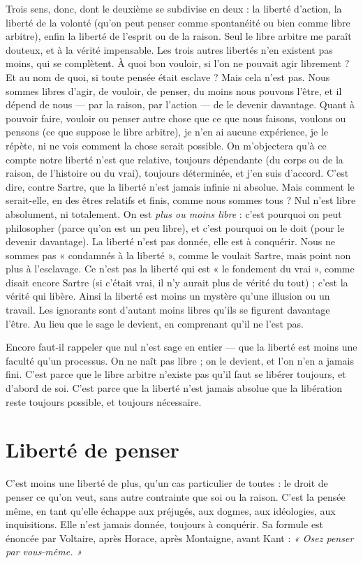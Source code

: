 {Trois sens, donc, dont le deuxième se subdivise en deux : la liberté d’action,
la liberté de la volonté (qu’on peut penser comme spontanéité ou bien comme
libre arbitre), enfin la liberté de l’esprit ou de la raison. Seul le libre arbitre me
paraît douteux, et à la vérité impensable. Les trois autres libertés n’en existent
pas moins, qui se complètent. À quoi bon vouloir, si l’on ne pouvait agir
librement ? Et au nom de quoi, si toute pensée était esclave ? Mais cela n’est
pas. Nous sommes libres d’agir, de vouloir, de penser, du moins nous pouvons
l'être, et il dépend de nous — par la raison, par l’action — de le devenir davantage.
Quant à pouvoir faire, vouloir ou penser autre chose que ce que nous faisons,
voulons ou pensons (ce que suppose le libre arbitre), je n’en ai aucune
expérience, je le répète, ni ne vois comment la chose serait possible. On
m'objectera qu’à ce compte notre liberté n’est que relative, toujours dépendante
(du corps ou de la raison, de l’histoire ou du vrai), toujours déterminée,
et j'en suis d’accord. C’est dire, contre Sartre, que la liberté n’est jamais infinie
ni absolue. Mais comment le serait-elle, en des êtres relatifs et finis, comme
nous sommes tous ? Nul n’est libre absolument, ni totalement. On est {\it plus ou
moins libre} : c’est pourquoi on peut philosopher (parce qu’on est un peu libre),
et c’est pourquoi on le doit (pour le devenir davantage). La liberté n’est pas
donnée, elle est à conquérir. Nous ne sommes pas « condamnés à la liberté »,
comme le voulait Sartre, mais point non plus à l'esclavage. Ce n’est pas la
liberté qui est « le fondement du vrai », comme disait encore Sartre (si c'était
vrai, il n’y aurait plus de vérité du tout) ; c’est la vérité qui libère. Ainsi la
liberté est moins un mystère qu’une illusion ou un travail. Les ignorants sont
d'autant moins libres qu'ils se figurent davantage l’être. Au lieu que le sage le
devient, en comprenant qu’il ne l’est pas.

Encore faut-il rappeler que nul n’est sage en entier — que la liberté est
moins une faculté qu’un processus. On ne naît pas libre ; on le devient, et l’on
n’en a jamais fini. C’est parce que le libre arbitre n’existe pas qu’il faut se libérer
toujours, et d’abord de soi. C’est parce que la liberté n’est jamais absolue que
la libération reste toujours possible, et toujours nécessaire.

\section{Liberté de penser}
C’est moins une liberté de plus, qu’un cas particulier
de toutes : le droit de penser ce qu’on veut,
sans autre contrainte que soi ou la raison. C’est la pensée même, en tant qu’elle
échappe aux préjugés, aux dogmes, aux idéologies, aux inquisitions. Elle n’est
jamais donnée, toujours à conquérir. Sa formule est énoncée par Voltaire, après
Horace, après Montaigne, avant Kant : {\it « Osez penser par vous-même. »}

}
